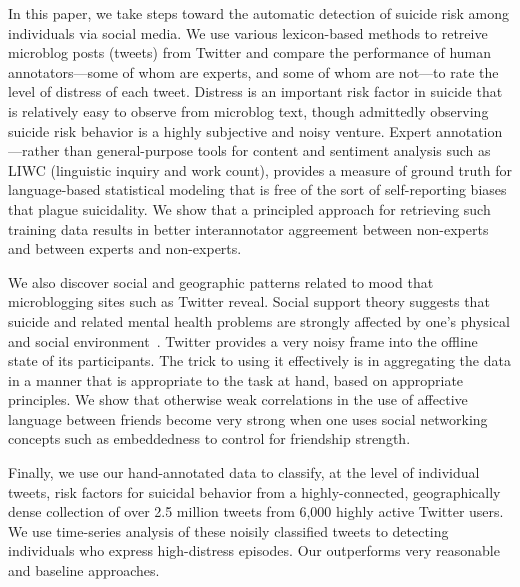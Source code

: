 \documentclass[11pt]{article}
\begin{document}
In this paper, we take steps toward the automatic detection of suicide risk among individuals via social media. We use various lexicon-based methods to retreive microblog posts (tweets) from Twitter and compare the performance of human annotators---some of
whom are experts, and some of whom are not---to rate the level of distress of each tweet. Distress is an important risk factor in suicide that is relatively easy to observe from microblog text, though admittedly observing suicide risk behavior is a highly subjective and noisy venture. Expert annotation---rather than general-purpose tools for content and sentiment analysis such as LIWC (linguistic inquiry and work count), provides a measure of ground truth for language-based statistical modeling that is free of the sort of self-reporting biases that plague suicidality. We show that a principled approach for retrieving such training data results in better interannotator aggreement between non-experts and between experts and non-experts.

We also discover social and geographic patterns related to mood that microblogging sites such as Twitter reveal. Social support theory suggests that suicide and related mental health problems are strongly affected by one's physical and social environment~\cite{wellman1990different}. Twitter provides a very noisy frame into the offline state of its participants. The trick to using it effectively is in aggregating the data in a manner that is appropriate to the task at hand, based on appropriate principles. We show that otherwise weak correlations in the use of affective language between friends become very strong when one uses social networking concepts such as embeddedness to control for friendship strength.

Finally, we use our hand-annotated data to classify, at the level of individual tweets, risk factors for suicidal  behavior from a highly-connected, geographically dense collection of over 2.5 million tweets from 6,000 highly active Twitter users. We use time-series analysis of these noisily classified tweets to detecting individuals who express high-distress episodes. Our outperforms very reasonable and baseline approaches.
\end{document}
